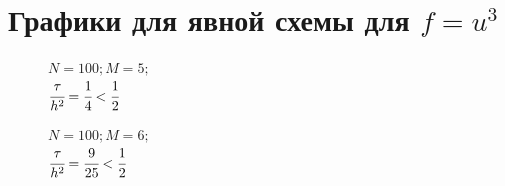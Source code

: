 \documentclass[12pt]{extarticle}
\numberwithin{equation}{section}
\begin{document}
\section{Графики для явной схемы для $f=u^3$}
\begin{figure}[H]
\begin{minipage}[h]{0.43\linewidth}
 $N=100; M=5;$\\$\cfrac{\tau}{h^2} = \cfrac{1}{4} < \cfrac{1}{2}$ \\
\end{minipage}
\hfill
\begin{minipage}[h]{0.43\linewidth}
 $N=100; M=6;$\\$ \cfrac{\tau}{h^2} = \cfrac{9}{25} < \cfrac{1}{2}$
\end{minipage}
\end{figure}
\end{document}
